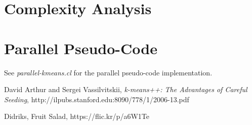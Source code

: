 \documentclass[11pt]{article}
\begin{document}
\section{Complexity Analysis}

\section{Parallel Pseudo-Code}

See \emph{parallel-kmeans.cl} for the parallel pseudo-code implementation.


\begin{thebibliography}{9}

  David Arthur and Sergei Vassilvitskii,
  \emph{k-means++: The Advantages of Careful Seeding},
  http://ilpubs.stanford.edu:8090/778/1/2006-13.pdf

  Didriks,
  Fruit Salad,
  https://flic.kr/p/a6W1Te

\end{thebibliography}
\end{document}
